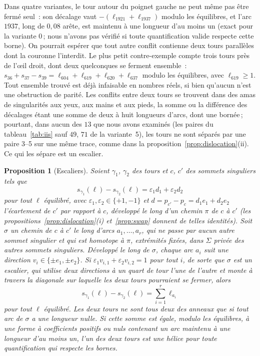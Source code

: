 \documentclass[11pt,a4paper]{article}
\newtheorem{proposition}{Proposition}
\newcommand{\shift}{s}
\begin{document}
Dans quatre variantes, le tour autour du poignet gauche ne peut même pas être
fermé seul~: son décalage vaut $-(\ell_{1921} + \ell_{1937})$ modulo les
équilibres, et l'arc $1937$, long de $0,08$ arête, est maintenu à une
longueur d'au moins un (exact pour la variante 0\,; nous n'avons pas vérifié
si toute quantification valide respecte cette borne). On pourrait espérer que
tout autre conflit contienne deux tours parallèles dont la couronne
l'interdit. Le plus petit contre-exemple compte trois tours près de l'œil
droit, dont deux quelconques se ferment ensemble~: $\shift_{36} + \shift_{37}
- \shift_{39} = \ell_{604} + \ell_{619} + \ell_{620} + \ell_{637}$ modulo les
équilibres, avec $\ell_{619} \ge 1$. Tout ensemble trouvé est déjà infaisable
en nombres réels, si bien qu'aucun n'est une obstruction de parité. Les
conflits entre deux tours se trouvent dans des amas de singularités aux yeux,
aux mains et aux pieds, la somme ou la différence des décalages étant une
somme de deux à huit longueurs d'arcs, dont une bornée\,; pourtant, dans aucun
des $13$ que nous avons examinés (les paires du tableau~\ref{tab:iis} sauf
$49$, $71$ de la variante~5), les tours ne sont séparés par une paire 3--5 sur
une même trace, comme dans la proposition~\ref{prop:dislocation}(ii). Ce qui
les sépare est un escalier.

\begin{proposition}[Escaliers]\label{prop:staircase}
Soient $\gamma_1$, $\gamma_2$ des tours et $c$, $c'$ des sommets singuliers
tels que
\[
  \shift_{\gamma_1}(\ell) - \shift_{\gamma_2}(\ell) = \varepsilon_1 d_1 +
  \varepsilon_2 d_2
\]
pour tout $\ell$ équilibré, avec $\varepsilon_1, \varepsilon_2 \in \{+1,
-1\}$ et $d = p_{c'} - p_c = d_1 e_1 + d_2 e_2$ l'écartement de $c'$ par
rapport à $c$, développé le long d'un chemin $\pi$ de $c$ à $c'$ (les
propositions~\ref{prop:dislocation}(i) et~\ref{prop:swap} donnent de telles
identités). Soit $\sigma$ un chemin de $c$ à $c'$ le long d'arcs $a_1, \dots,
a_r$, qui ne passe par aucun autre sommet singulier et qui est homotope à
$\pi$, extrémités fixées, dans $\Sigma$ privée des autres sommets singuliers.
Développé le long de $\sigma$, chaque arc $a_i$ suit une direction $v_i \in
\{\pm e_1, \pm e_2\}$. Si $\varepsilon_1 v_{i,1} + \varepsilon_2 v_{i,2} = 1$
pour tout $i$, de sorte que $\sigma$ est un \emph{escalier}, qui utilise deux
directions à un quart de tour l'une de l'autre et monte à travers la diagonale
sur laquelle les deux tours pourraient se fermer, alors
\[
  \shift_{\gamma_1}(\ell) - \shift_{\gamma_2}(\ell) = \sum_{i=1}^r \ell_{a_i}
\]
pour tout $\ell$ équilibré. Les deux tours ne sont tous deux des anneaux que
si tout arc de $\sigma$ a une longueur nulle. Si cette somme est égale, modulo
les équilibres, à une forme à coefficients positifs ou nuls contenant un arc
maintenu à une longueur d'au moins un, l'un des deux tours est une hélice pour
toute quantification qui respecte les bornes.
\end{proposition}
\end{document}

